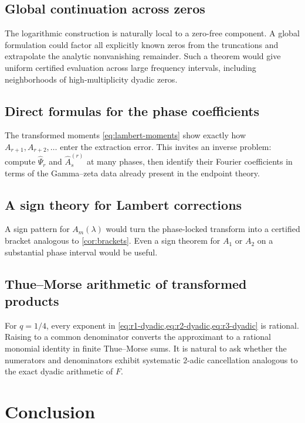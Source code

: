 \documentclass[11pt]{article}
\theoremstyle{definition}
\theoremstyle{remark}
\begin{document}
\subsection{Global continuation across zeros}

The logarithmic construction is naturally local to a zero-free component. A global formulation could factor all explicitly known zeros from the truncations and extrapolate the analytic nonvanishing remainder. Such a theorem would give uniform certified evaluation across large frequency intervals, including neighborhoods of high-multiplicity dyadic zeros.

\subsection{Direct formulas for the phase coefficients}

The transformed moments \cref{eq:lambert-moments} show exactly how $A_{r+1},A_{r+2},\ldots$ enter the extraction error. This invites an inverse problem: compute $\widehat\Psi_r$ and $\widehat A_s^{(r)}$ at many phases, then identify their Fourier coefficients in terms of the Gamma--zeta data already present in the endpoint theory.

\subsection{A sign theory for Lambert corrections}

A sign pattern for $A_m(\lambda)$ would turn the phase-locked transform into a certified bracket analogous to \cref{cor:brackets}. Even a sign theorem for $A_1$ or $A_2$ on a substantial phase interval would be useful.

\subsection{Thue--Morse arithmetic of transformed products}

For $q=1/4$, every exponent in \cref{eq:r1-dyadic,eq:r2-dyadic,eq:r3-dyadic} is rational. Raising to a common denominator converts the approximant to a rational monomial identity in finite Thue--Morse sums. It is natural to ask whether the numerators and denominators exhibit systematic $2$-adic cancellation analogous to the exact dyadic arithmetic of $F$.

\section{Conclusion}
\end{document}
